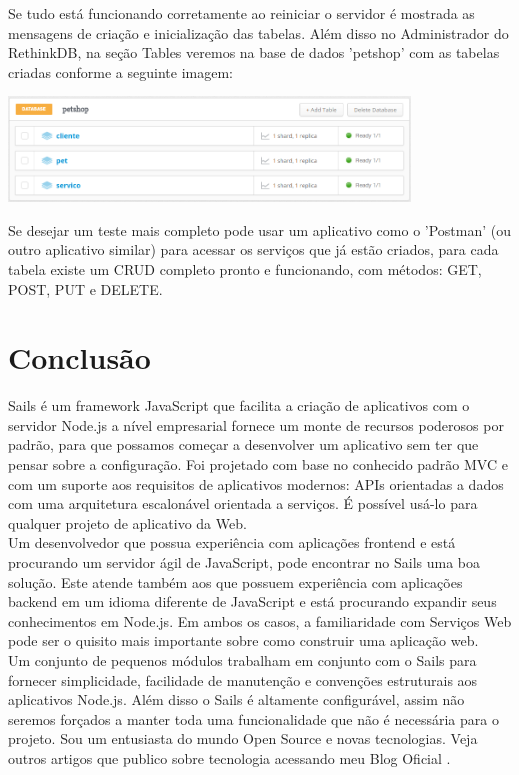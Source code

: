 \documentclass[a4paper,11pt]{article}
\begin{document}
Se tudo está funcionando corretamente ao reiniciar o servidor é mostrada as mensagens de criação e inicialização das tabelas. Além disso no Administrador do RethinkDB, na seção Tables veremos na base de dados 'petshop' com as tabelas criadas conforme a seguinte imagem:
\begin{center} 
\includegraphics[width=0.8\textwidth]{tabelas.png} 
\end{center}
Se desejar um teste mais completo pode usar um aplicativo como o 'Postman' (ou outro aplicativo similar) para acessar os serviços que já estão criados, para cada tabela existe um CRUD completo pronto e funcionando, com métodos: GET, POST, PUT e DELETE.

\section{Conclusão}
Sails é um framework JavaScript que facilita a criação de aplicativos com o servidor Node.js a nível empresarial fornece um monte de recursos poderosos por padrão, para que possamos começar a desenvolver um aplicativo sem ter que pensar sobre a configuração. Foi projetado com base no conhecido padrão MVC e com um suporte aos requisitos de aplicativos modernos: APIs orientadas a dados com uma arquitetura escalonável orientada a serviços. É possível usá-lo para qualquer projeto de aplicativo da Web. \\[3mm]
Um desenvolvedor que possua experiência com aplicações frontend e está procurando um servidor ágil de JavaScript, pode encontrar no Sails uma boa solução. Este atende também aos que possuem experiência com aplicações backend em um idioma diferente de JavaScript e está procurando expandir seus conhecimentos em Node.js. Em ambos os casos, a familiaridade com Serviços Web pode ser o quisito mais importante sobre como construir uma aplicação web. \\[3mm]
Um conjunto de pequenos módulos trabalham em conjunto com o Sails para fornecer simplicidade, facilidade de manutenção e convenções estruturais aos aplicativos Node.js. Além disso o Sails é altamente configurável, assim não seremos forçados a manter toda uma funcionalidade que não é necessária para o projeto. Sou um entusiasta do mundo Open Source e novas tecnologias. Veja outros artigos que publico sobre tecnologia acessando meu Blog Oficial \cite{fernandoanselmo}.
\end{document}
